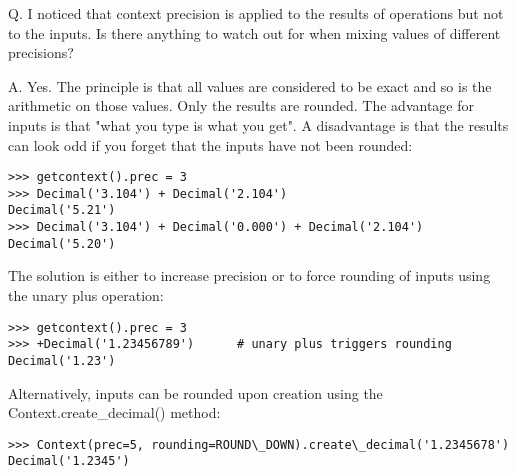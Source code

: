 Q. I noticed that context precision is applied to the results of operations but not to the inputs. Is there anything to watch out for when mixing values of different precisions?

A. Yes. The principle is that all values are considered to be exact and so is the arithmetic on those values. Only the results are rounded. The advantage for inputs is that "what you type is what you get". A disadvantage is that the results can look odd if you forget that the inputs have not been rounded:

\begin{lstlisting}
>>> getcontext().prec = 3
>>> Decimal('3.104') + Decimal('2.104')
Decimal('5.21')
>>> Decimal('3.104') + Decimal('0.000') + Decimal('2.104')
Decimal('5.20')
\end{lstlisting}

The solution is either to increase precision or to force rounding of inputs using the unary plus operation:

\begin{lstlisting}
>>> getcontext().prec = 3
>>> +Decimal('1.23456789')      # unary plus triggers rounding
Decimal('1.23')
\end{lstlisting}

Alternatively, inputs can be rounded upon creation using the Context.create\_decimal() method:

\begin{lstlisting}
>>> Context(prec=5, rounding=ROUND\_DOWN).create\_decimal('1.2345678')
Decimal('1.2345')
\end{lstlisting}


